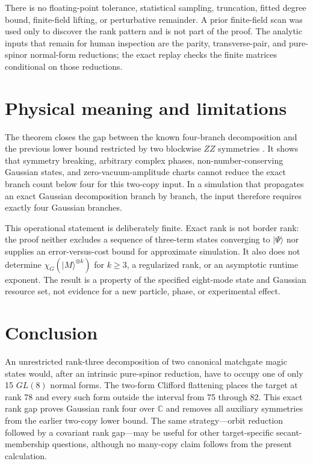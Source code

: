 \documentclass[aps,pra,reprint,groupedaddress,nofootinbib,longbibliography]{revtex4-2}
\newcommand{\ket}[1]{\lvert #1\rangle}
\newcommand{\C}{\mathbb{C}}
\begin{document}
There is no floating-point tolerance, statistical sampling, truncation, fitted
degree bound, finite-field lifting, or perturbative remainder.  A prior
finite-field scan was used only to discover the rank pattern and is not part of
the proof.  The analytic inputs that remain for human inspection are the parity,
transverse-pair, and pure-spinor normal-form reductions; the exact replay checks
the finite matrices conditional on those reductions.

\section{Physical meaning and limitations}
\label{sec:meaning}

The theorem closes the gap between the known four-branch decomposition and the
previous lower bound restricted by two blockwise $ZZ$ symmetries
\cite{CudbyStrelchuk2025}.  It shows that symmetry breaking, arbitrary complex
phases, non-number-conserving Gaussian states, and zero-vacuum-amplitude charts
cannot reduce the exact branch count below four for this two-copy input.  In a
simulation that propagates an exact Gaussian decomposition branch by branch, the
input therefore requires exactly four Gaussian branches.

This operational statement is deliberately finite.  Exact rank is not border
rank: the proof neither excludes a sequence of three-term states converging to
$\ket\Psi$ nor supplies an error-versus-cost bound for approximate simulation.
It also does not determine $\chi_G(\ket M^{\otimes k})$ for $k\ge3$, a
regularized rank, or an asymptotic runtime exponent.  The result is a property of
the specified eight-mode state and Gaussian resource set, not evidence for a new
particle, phase, or experimental effect.

\section{Conclusion}

An unrestricted rank-three decomposition of two canonical matchgate magic states
would, after an intrinsic pure-spinor reduction, have to occupy one of only 15
$GL(8)$ normal forms.  The two-form Clifford flattening places the target at rank
78 and every such form outside the interval from 75 through 82.  This exact rank
gap proves Gaussian rank four over $\C$ and removes all auxiliary symmetries from
the earlier two-copy lower bound.  The same strategy---orbit reduction followed
by a covariant rank gap---may be useful for other target-specific secant-membership
questions, although no many-copy claim follows from the present calculation.
\end{document}
